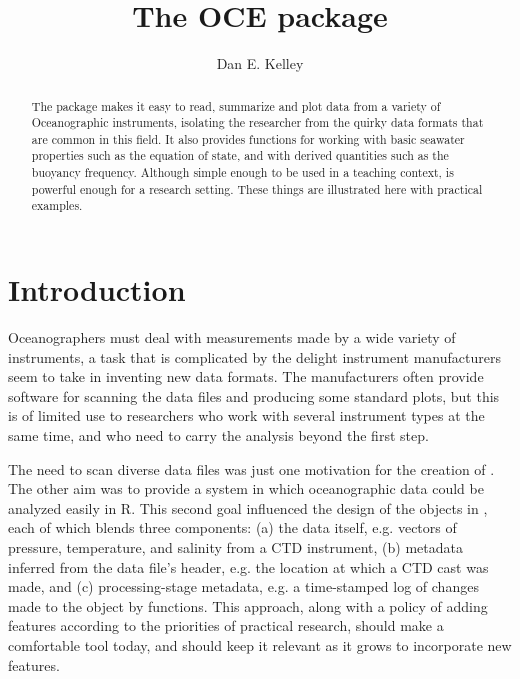 \documentclass{article}
\begin{document}
\title{The OCE package}
\author{Dan E. Kelley}
\maketitle


\begin{abstract}

The \verb@oce@ package makes it easy to read, summarize and plot data from a variety of
Oceanographic instruments, isolating the researcher from the quirky data formats that are
common in this field. It also provides functions for working with basic seawater properties
such as the equation of state, and with derived quantities such as the buoyancy frequency.
Although simple enough to be used in a teaching context, \verb@oce@ is powerful enough for a
research setting.  These things are illustrated here with practical examples.

\end{abstract}

\section{Introduction}

Oceanographers must deal with measurements made by a wide variety of instruments, a task that
is complicated by the delight instrument manufacturers seem to take in inventing new data
formats. The manufacturers often provide software for scanning the data files and producing
some standard plots, but this is of limited use to researchers who work with several instrument
types at the same time, and who need to carry the analysis beyond the first step.

The need to scan diverse data files was just one motivation for the creation of \verb@oce@. The
other aim was to provide a system in which oceanographic data could be analyzed easily in R.
This second goal influenced the design of the objects in \verb@oce@, each of which blends three
components: (a) the data itself, e.g. vectors of pressure, temperature, and salinity from a CTD
instrument, (b) metadata inferred from the data file's header, e.g. the location at which a CTD
cast was made, and (c) processing-stage metadata, e.g. a time-stamped log of changes made to
the object by \verb@oce@ functions. This approach, along with a policy of adding features
according to the priorities of practical research, should make \verb@oce@ a comfortable tool
today, and should keep it relevant as it grows to incorporate new features.
\end{document}
